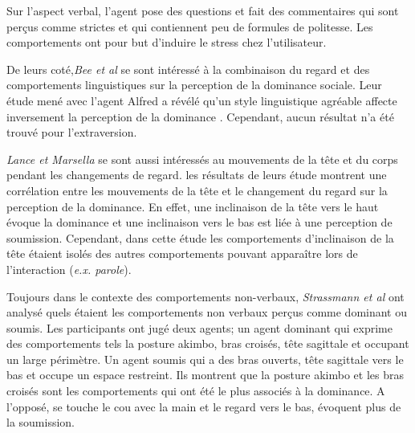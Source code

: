 		Sur l'aspect verbal, l'agent pose des questions et fait des commentaires qui sont perçus comme strictes et qui contiennent peu de formules de politesse. 
		 Les comportements ont pour but d'induire le stress chez l'utilisateur. 
		
		De leurs coté,\emph{Bee et al} \cite{bee2010bossy} se sont intéressé à la combinaison du regard et des comportements linguistiques sur la perception de la dominance sociale.  Leur étude mené avec l'agent Alfred a révélé qu'un style linguistique agréable affecte inversement la perception de la dominance \cite{bee2010bossy}. Cependant, aucun résultat n'a été trouvé pour l'extraversion.
		
		 \emph{Lance et Marsella} \cite{lance2008relation,lance2007emotionally} se sont aussi intéressés au mouvements de la tête et du corps pendant les changements de regard. les résultats de leurs étude montrent une corrélation entre les mouvements de la tête et le changement du regard sur la perception de la dominance. En effet, une inclinaison de la tête vers le haut évoque la dominance et une inclinaison vers le bas est liée à une perception de soumission. Cependant, dans cette étude les comportements d'inclinaison de la tête étaient isolés des autres comportements pouvant apparaître lors de l'interaction (\emph{e.x. parole}).
		
		Toujours dans le contexte des comportements non-verbaux, \emph{Strassmann et al} \cite{strassmann2016effect} ont analysé quels étaient les comportements non verbaux perçus comme dominant ou soumis. 
		Les participants ont jugé deux agents;  un agent dominant qui exprime des comportements tels la posture akimbo, bras croisés, tête sagittale et occupant un large périmètre. Un agent soumis qui a des bras ouverts, tête sagittale vers le bas et occupe un espace restreint.
		Ils montrent que la posture akimbo et les bras croisés sont les comportements qui ont été le plus associés à la dominance. A l'opposé, se touche le cou avec la main et le regard vers le bas, évoquent plus de la soumission. 
		
